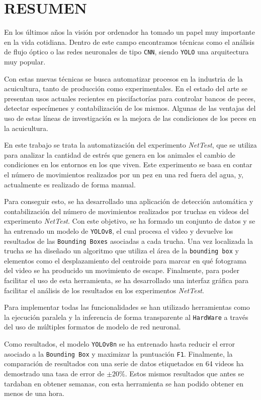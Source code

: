 \section*{RESUMEN}
\thispagestyle{abstract}
En los últimos años la visión por ordenador ha tomado un papel muy importante en la vida cotidiana. Dentro de este campo encontramos técnicas como el análisis de 
flujo óptico o las redes neuronales de tipo \texttt{CNN}, siendo \texttt{YOLO} una arquitectura muy popular.

Con estas nuevas técnicas se busca automatizar procesos en la industria de la acuicultura, tanto de producción como experimentales. En el estado del arte se presentan 
usos actuales recientes en piscifactorías para controlar bancos de peces, detectar especímenes y contabilización de los mismos. Algunas de las ventajas del uso de estas 
líneas de investigación es la mejora de las condiciones de los peces en la acuicultura. 

En este trabajo se trata la automatización del experimento \textit{NetTest}, que se utiliza para analizar la cantidad de estrés que genera en los animales el cambio de 
condiciones en los entornos en los que viven. Este experimento se basa en contar el número de movimientos realizados por un pez en una red fuera del agua, y, actualmente 
es realizado de forma manual.

Para conseguir esto, se ha desarrollado una aplicación de detección automática y contabilización del número de movimientos realizados por truchas en videos del experimento 
\textit{NetTest}. Con este objetivo, se ha formado un conjunto de datos y se ha entrenado un modelo de \texttt{YOLOv8}, el cual procesa el video y devuelve los resultados de 
las \texttt{Bounding Boxes} asociadas a cada trucha.\newline
Una vez localizada la trucha se ha diseñado un algoritmo que utiliza el área de la \texttt{bounding box} y elementos como el desplazamiento del centroide para marcar en qué 
fotograma del video se ha producido un movimiento de escape. Finalmente, para poder facilitar el uso de esta herramienta, se ha desarrollado una interfaz gráfica para 
facilitar el análisis de los resultados en los experimentos \textit{NetTest}.

Para implementar todas las funcionalidades se han utilizado herramientas como la ejecución paralela y la inferencia de forma transparente al \texttt{HardWare} a través del uso 
de múltiples formatos de modelo de red neuronal.

Como resultados, el modelo \texttt{YOLOv8n} se ha entrenado hasta reducir el error asociado a la \texttt{Bounding Box} y maximizar la puntuación \texttt{F1}. Finalmente, la 
comparación de resultados con una serie de datos etiquetados en 64 videos ha demostrado una tasa de error de \texttt{$ \pm 20\% $}. Estos mismos resultados que antes se tardaban 
en obtener semanas, con esta herramienta se han podido obtener en menos de una hora.